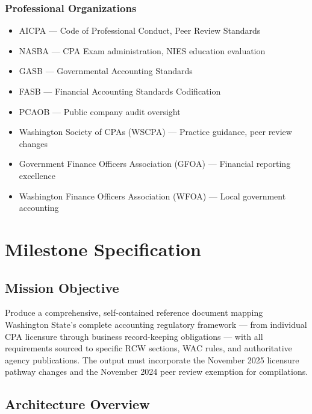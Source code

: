 \documentclass[11pt,letterpaper]{article}
\newcommand{\stageheader}[2]{%
  \noindent\colorbox{#2}{\makebox[\textwidth][l]{%
    \textcolor{white}{\bfseries\sffamily\hspace{6pt}#1\hspace{6pt}}}}%
  \vspace{0.5em}\par%
}
\begin{document}
\subsubsection*{Professional Organizations}
\begin{itemize}[leftmargin=2em]
  \item AICPA --- Code of Professional Conduct, Peer Review Standards
  \item NASBA --- CPA Exam administration, NIES education evaluation
  \item GASB --- Governmental Accounting Standards
  \item FASB --- Financial Accounting Standards Codification
  \item PCAOB --- Public company audit oversight
  \item Washington Society of CPAs (WSCPA) --- Practice guidance, peer review changes
  \item Government Finance Officers Association (GFOA) --- Financial reporting excellence
  \item Washington Finance Officers Association (WFOA) --- Local government accounting
\end{itemize}

\newpage

\stageheader{STAGE 3 --- MISSION PACKAGE}{tertiary}

\section{Milestone Specification}

\subsection{Mission Objective}

Produce a comprehensive, self-contained reference document mapping Washington State's complete accounting regulatory framework --- from individual CPA licensure through business record-keeping obligations --- with all requirements sourced to specific RCW sections, WAC rules, and authoritative agency publications. The output must incorporate the November 2025 licensure pathway changes and the November 2024 peer review exemption for compilations.

\subsection{Architecture Overview}
\end{document}
